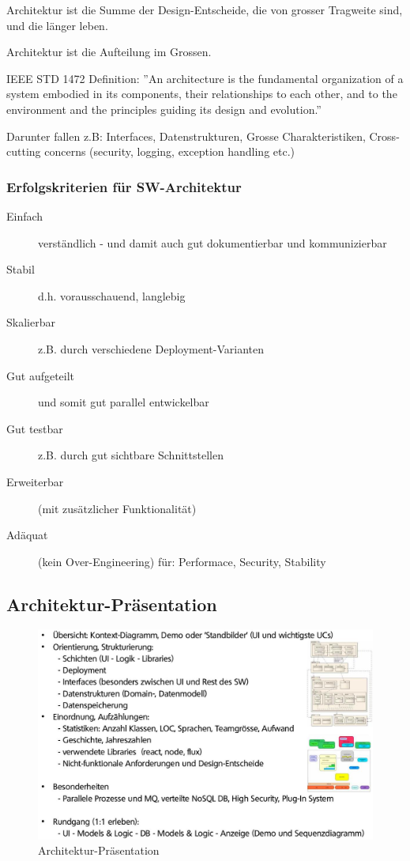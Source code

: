 Architektur ist die Summe der Design-Entscheide, die von grosser Tragweite sind, und die länger leben.

Architektur ist die Aufteilung im Grossen.

IEEE STD 1472 Definition: ''An architecture is the fundamental organization of a system embodied in its components, their relationships to each other, and to the environment and the principles guiding its design and evolution.''

Darunter fallen z.B: Interfaces, Datenstrukturen, Grosse Charakteristiken, Cross-cutting concerns (security, logging, exception handling etc.)

\subsubsection{Erfolgskriterien für SW-Architektur}

\begin{description}
	\item[Einfach] verständlich - und damit auch gut dokumentierbar und kommunizierbar
	\item[Stabil] d.h. vorausschauend, langlebig
	\item[Skalierbar] z.B. durch verschiedene Deployment-Varianten
	\item[Gut aufgeteilt] und somit gut parallel entwickelbar
	\item[Gut testbar] z.B. durch gut sichtbare Schnittstellen
	\item[Erweiterbar] (mit zusätzlicher Funktionalität)
	\item[Adäquat] (kein Over-Engineering) für: Performace, Security, Stability
\end{description}

\subsection{Architektur-Präsentation}

\begin{figure}[h]
	\centering
	\includegraphics[width=0.7\linewidth]{img/architektur_praesentation}
	\caption{Architektur-Präsentation}
	\label{fig:architekturpraesentation}
\end{figure}

